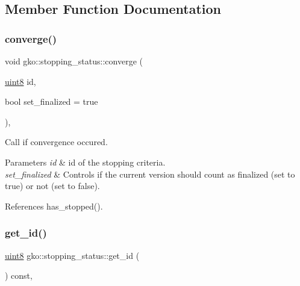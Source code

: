 \subsection{Member Function Documentation}
\mbox{\label{classgko_1_1stopping__status_a611bf8c81a8e3b22bab8f19ff68e8a12}} 
\subsubsection{\texorpdfstring{converge()}{converge()}}
{\footnotesize\ttfamily void gko\+::stopping\+\_\+status\+::converge (\begin{DoxyParamCaption}\item[{\hyperlink{namespacegko_a3950fc3732811a8563484e5098c31531}{uint8}}]{id,  }\item[{bool}]{set\+\_\+finalized = {\ttfamily true} }\end{DoxyParamCaption})\hspace{0.3cm}{\ttfamily [inline]}, {\ttfamily [noexcept]}}



Call if convergence occured. 


\begin{DoxyParams}{Parameters}
{\em id} & id of the stopping criteria. \\
\hline
{\em set\+\_\+finalized} & Controls if the current version should count as finalized (set to true) or not (set to false). \\
\hline
\end{DoxyParams}


References has\+\_\+stopped().

\mbox{\label{classgko_1_1stopping__status_ae3c4d0e7a01f4e1892a09f418ea0907d}} 
\subsubsection{\texorpdfstring{get\+\_\+id()}{get\_id()}}
{\footnotesize\ttfamily \hyperlink{namespacegko_a3950fc3732811a8563484e5098c31531}{uint8} gko\+::stopping\+\_\+status\+::get\+\_\+id (\begin{DoxyParamCaption}{ }\end{DoxyParamCaption}) const\hspace{0.3cm}{\ttfamily [inline]}, {\ttfamily [noexcept]}}



